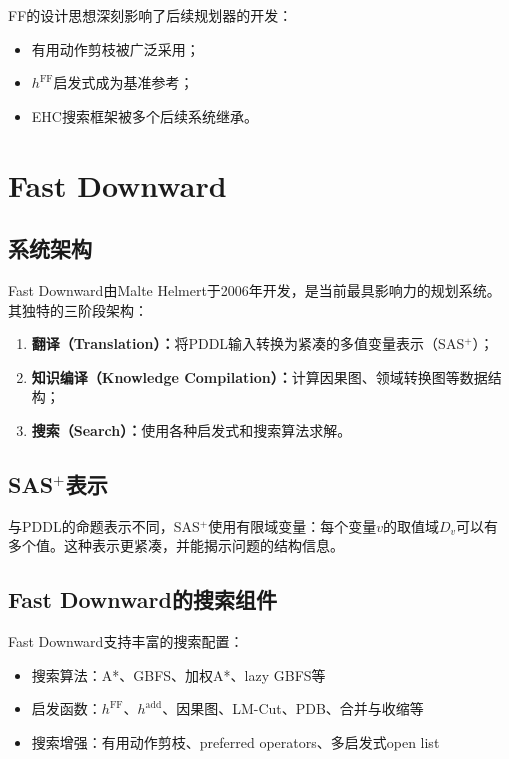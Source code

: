 FF的设计思想深刻影响了后续规划器的开发：
\begin{itemize}
  \item 有用动作剪枝被广泛采用；
  \item $h^{\mathrm{FF}}$启发式成为基准参考；
  \item EHC搜索框架被多个后续系统继承。
\end{itemize}

\section{Fast Downward \ug}

\subsection{系统架构}

Fast Downward由Malte Helmert于2006年开发，是当前最具影响力的规划系统。其独特的三阶段架构：

\begin{enumerate}
  \item \textbf{翻译（Translation）：}将PDDL输入转换为紧凑的多值变量表示（SAS$^+$）；
  \item \textbf{知识编译（Knowledge Compilation）：}计算因果图、领域转换图等数据结构；
  \item \textbf{搜索（Search）：}使用各种启发式和搜索算法求解。
\end{enumerate}

\subsection{SAS$^+$表示}

与PDDL的命题表示不同，SAS$^+$使用有限域变量：每个变量$v$的取值域$D_v$可以有多个值。这种表示更紧凑，并能揭示问题的结构信息。

\subsection{Fast Downward的搜索组件}

Fast Downward支持丰富的搜索配置：
\begin{itemize}
  \item 搜索算法：A*、GBFS、加权A*、lazy GBFS等
  \item 启发函数：$h^{\mathrm{FF}}$、$h^{\mathrm{add}}$、因果图、LM-Cut、PDB、合并与收缩等
  \item 搜索增强：有用动作剪枝、preferred operators、多启发式open list
\end{itemize}

